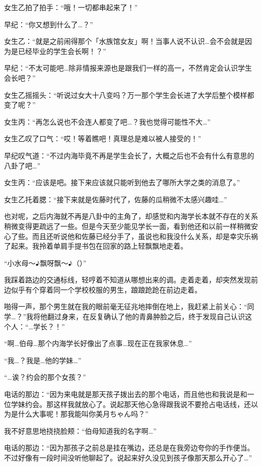 女生乙拍了拍手：“哦！一切都串起来了！”

早纪：“你又想到什么了…？”

女生乙：“就是之前闹得那个「水族馆女友」啊！当事人说不认识…会不会就是因为是已经毕业的学生会长啊！？”

早纪：“不太可能吧…除非情报来源也是跟我们一样的高一，不然肯定会认识学生会长吧？”

女生乙摇摇头：“听说过女大十八变吗？万一那个学生会长进了大学后整个模样都变了呢？”

女生丙：“再怎么说也不会连人都变了吧…？我也觉得可能性不大…”

女生乙叹了口气：“哎！等着瞧吧！真理总是难以被人接受的！”

早纪叹气道：“不过内海毕竟不再是学生会长了，大概之后也不会有什么有意思的八卦了吧…”

女生丙：“应该是吧。接下来应该就只能听到他去了哪所大学之类的消息了。”

女生乙托着腮：“接下来就是佐藤时代了，佐藤的瓜稍微不太感兴趣哇…”

也对呢，之后内海就不再是八卦中的主角了，却感觉和内海学长本就不存在的关系稍微变得更疏远了一些。但是今天至少能见学长一面，看到他还和以前一样稍微安心了些。而且还听说他和佐藤已经分手了，虽说也和我没什么关系，却是幸灾乐祸了起来。我拎着单肩手提书包在回家的路上轻飘飘地走着。

“小水母～$\eighthnote$飘呀飘～$\eighthnote$（）”

我踩着路边的交通标线，轻哼着不知道从哪想出来的调。走着走着，却突然发现前边似乎有个穿着同一个学校校服的男生，踉踉跄跄在前边走着。

啪得一声，那个男生就在我的眼前毫无征兆地摔倒在地上，我赶紧上前关心：“同学…？”我将他翻过身来，在反复确认了他的青鼻肿脸之后，终于发现自己认识这个人：“…学长？！”

\cutlinef\tired

\newday{\cloudy\sunset}

“啊…伯母…那个内海学长好像出了点事…现在正在我家休息…”

“我…？我是…他的学妹…”

“…诶？约会的那个女孩？”

电话的那边：“因为来电就是那天孩子拨出去的那个电话，而且他也和我说是和一位学妹约会。那这样我就放心了。说起那天他心急得跟我说不要抢占电话线，还以为是什么大事呢！那我能叫你美月ちゃん吗？”

我不好意思地挠挠脸颊：“伯母知道我的名字啊…”

电话的那边：“因为那孩子之前总是挂在嘴边，还总是在我旁边夸你的手作便当。不过好像有一段时间没听他聊起了。说起来好久没见到孩子像那天那么开心了…”

